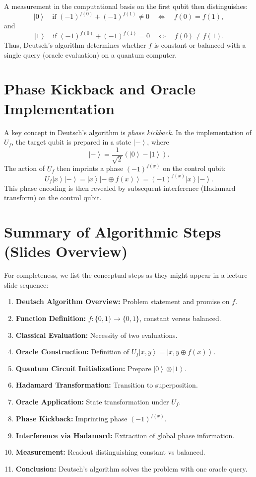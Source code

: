 \documentclass[11pt,oneside]{book}
\theoremstyle{remark}
\renewcommand{\ket}[1]{\left|#1\right\rangle}
\begin{document}
	A measurement in the computational basis on the first qubit then distinguishes:
	\[
	\ket{0} \quad \text{if } (-1)^{f(0)}+(-1)^{f(1)}\neq 0 \quad \Longleftrightarrow \quad f(0)=f(1),
	\]
	and
	\[
	\ket{1} \quad \text{if } (-1)^{f(0)}+(-1)^{f(1)}=0 \quad \Longleftrightarrow \quad f(0)\neq f(1).
	\]
	Thus, Deutsch's algorithm determines whether $f$ is constant or balanced with a single query (oracle evaluation) on a quantum computer.
	
	\section{Phase Kickback and Oracle Implementation}
	
	A key concept in Deutsch's algorithm is \emph{phase kickback}. In the implementation of $U_f$, the target qubit is prepared in a state $\ket{-}$, where
	\[
	\ket{-}=\frac{1}{\sqrt{2}}(\ket{0}-\ket{1}).
	\]
	The action of $U_f$ then imprints a phase $(-1)^{f(x)}$ on the control qubit:
	\[
	U_f\ket{x}\ket{-}=\ket{x}\ket{-\oplus f(x)} = (-1)^{f(x)}\ket{x}\ket{-}.
	\]
	This phase encoding is then revealed by subsequent interference (Hadamard transform) on the control qubit.
	
	\section{Summary of Algorithmic Steps (Slides Overview)}
	For completeness, we list the conceptual steps as they might appear in a lecture slide sequence:
	\begin{enumerate}[label=\textbf{Slide \arabic*:}, leftmargin=*, align=left]
		\item \textbf{Deutsch Algorithm Overview:} Problem statement and promise on $f$.
		\item \textbf{Function Definition:} $f:\{0,1\}\to\{0,1\}$, constant versus balanced.
		\item \textbf{Classical Evaluation:} Necessity of two evaluations.
		\item \textbf{Oracle Construction:} Definition of $U_f\ket{x,y}=\ket{x,y\oplus f(x)}$.
		\item \textbf{Quantum Circuit Initialization:} Prepare $\ket{0}\otimes\ket{1}$.
		\item \textbf{Hadamard Transformation:} Transition to superposition.
		\item \textbf{Oracle Application:} State transformation under $U_f$.
		\item \textbf{Phase Kickback:} Imprinting phase $(-1)^{f(x)}$.
		\item \textbf{Interference via Hadamard:} Extraction of global phase information.
		\item \textbf{Measurement:} Readout distinguishing constant vs balanced.
		\item \textbf{Conclusion:} Deutsch's algorithm solves the problem with one oracle query.
	\end{enumerate}
	
\end{document}

